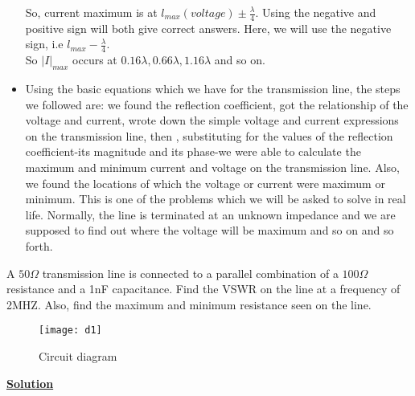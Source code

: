 \begin{itemize}
	So, current maximum is at $l_{max}(voltage)\pm \frac{\lambda}{4}$. Using the negative and positive sign will both give correct answers. Here, we will use the negative sign, i.e $l_{max}-\frac{\lambda}{4}$.\\
	
	So $|I|_{max}$ occurs at $0.16\lambda , 0.66\lambda , 1.16\lambda$ and so on.
	\item Using the basic equations which we have for the transmission line, the steps we followed are: we found the reflection coefficient, got the relationship of the voltage and current, wrote down the simple voltage and current expressions on the transmission line, then , substituting for the values of the reflection coefficient-its magnitude and its phase-we were able to calculate the maximum and minimum current and voltage on the transmission line. Also, we found the locations of which the voltage or current were maximum or minimum. This is one of the problems which we will be asked to solve in real life. Normally, the line is terminated at an unknown impedance and we are supposed to find out where the voltage will be maximum and so on and so forth.
\end{itemize}

\begin{example}
	A $50\Omega$ transmission line is connected to a parallel combination of a $100\Omega$ resistance and a 1nF capacitance. Find the VSWR on the line at a frequency of 2MHZ. Also, find the maximum and minimum resistance seen on the line.
\end{example}

\begin{figure}[h]
	\centering
	\texttt{[image: d1]}

	\caption{Circuit diagram}
\end{figure}

\begin{center}
	\textbf{\underline{{\large Solution}}}
\end{center}

